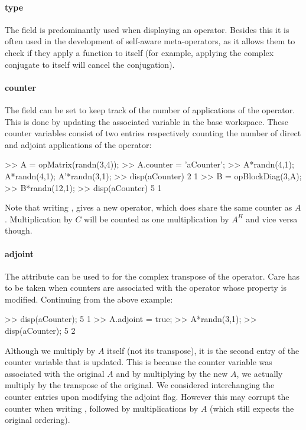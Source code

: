 \paragraph*{type} The  field is predominantly used when
displaying an operator. Besides this it is often used in the
development of self-aware meta-operators, as it allows them to check
if they apply a function to itself (for example, applying the complex
conjugate to itself will cancel the conjugation).

\paragraph*{counter} The  field can be set to keep
track of the number of applications of the operator. This is done by
updating the associated variable in the base workspace. These counter
variables consist of two entries respectively counting the number of
direct and adjoint applications of the operator:
\begin{codeblock}
>> A = opMatrix(randn(3,4));
>> A.counter = 'aCounter';
>> A*randn(4,1); A*randn(4,1); A'*randn(3,1);
>> disp(aCounter)
     2     1
>> B = opBlockDiag(3,A);
>> B*randn(12,1);
>> disp(aCounter)
     5     1
\end{codeblock}
Note that writing , gives a new operator, which does
share the same counter as $A$. Multiplication by $C$ will be counted
as one multiplication by $A^H$ and vice versa though.

\paragraph*{adjoint} The  attribute can be used to for
the complex transpose of the operator. Care has to be taken when
counters are associated with the operator whose 
property is modified. Continuing from the above example:
\begin{codeblock}
>> disp(aCounter);
     5     1
>> A.adjoint = true;
>> A*randn(3,1);
>> disp(aCounter);
     5     2
\end{codeblock}
Although we multiply by $A$ itself (not its transpose), it is the
second entry of the counter variable that is updated. This is because
the counter variable was associated with the original $A$ and by
multiplying by the new $A$, we actually multiply by the transpose of
the original. We considered interchanging the counter entries upon
modifying the adjoint flag. However this may corrupt the counter when
writing , followed by multiplications
by $A$ (which still expects the original ordering).

